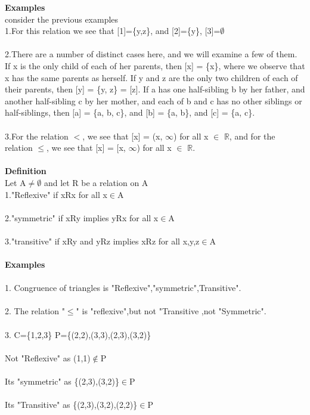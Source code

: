 \documentclass[a4paper,english,12pt]{article}
\begin{document}
\textbf{Examples}\\
consider the previous examples \\
1.For this relation we see that [1]=\{y,z\}, and [2]=\{y\}, [3]=$\emptyset$\\\\
2.There are a number of distinct cases here, and we will examine a few of them.
If x is the only child of each of her parents, then [x] = \{x\}, where we observe that
x has the same parents as herself. If y and z are the only two children of each of
their parents, then [y] = \{y, z\} = [z]. If a has one half-sibling b by her father, and
another half-sibling c by her mother, and each of b and c has no other siblings or
half-siblings, then [a] = \{a, b, c\}, and [b] = \{a, b\}, and [c] = \{a, c\}.\\\\
3.For the relation $<$, we see that [x] = (x, $\infty$) for all x $\in$ $\mathbb{R}$, and for the relation
$\leq$, we see that [x] = [x, $\infty$) for all x $\in$ $\mathbb{R}$.\\\\
\textbf{Definition}\\
Let A$\neq \emptyset$ and let R be a relation on A\\
1."Reflexive" if xRx for all x$\in$A\\\\
2."symmetric" if xRy implies yRx for all x$\in$A\\\\
3."transitive" if xRy and yRz implies xRz for all x,y,z$\in$A\\\\
\textbf{Examples}\\\\
1. Congruence of triangles is "Reflexive","symmetric",Transitive".\\\\
2. The relation "$\leq$" is "reflexive",but not "Transitive ,not "Symmetric".\\\\
3. C=\{1,2,3\} P=\{(2,2),(3,3),(2,3),(3,2)\}\\\\
  Not "Reflexive" as (1,1)$\notin$P\\\\
  Its "symmetric" as \{(2,3),(3,2)\}$\in$P\\\\
  Its "Transitive" as \{(2,3),(3,2),(2,2)\}$\in$P\\\\
\end{document}
